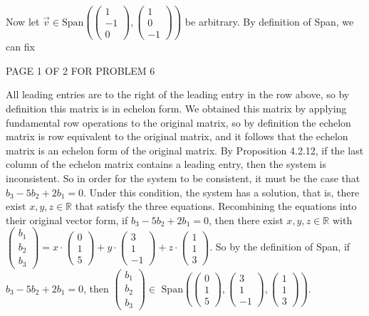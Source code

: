 \documentclass[12pt]{article}
\newenvironment{problem}[2][Problem]
{
	\begin{trivlist} 
		\item[\hskip \labelsep {\bfseries #1 #2:}]
	}
{
	\end{trivlist}
	}
\newenvironment{solution}[1][Solution]
{
	\begin{trivlist} 
		\item[\hskip \labelsep {\itshape #1:}]
	}
	{
	\end{trivlist}
}
\begin{document}
\begin{problem}{6}
\begin{solution}
Now let $\vec{v} \in \text{Span}\left(\begin{pmatrix}1\\-1\\0\end{pmatrix}, \begin{pmatrix}1\\0\\-1\end{pmatrix}\right)$ be arbitrary. By definition of Span, we can fix
\end{solution}
\vfill
\centerline{PAGE 1 OF 2 FOR PROBLEM 6}
%
%
%
\newpage
All leading entries are to the right of the leading entry in the row above, so by definition this matrix is in echelon form. We obtained this matrix by applying fundamental row operations to the original matrix, so by definition the echelon matrix is row equivalent to the original matrix, and it follows that the echelon matrix is an echelon form of the original matrix. By Proposition 4.2.12, if the last column of the echelon matrix contains a leading entry, then the system is inconsistent. So in order for the system to be consistent, it must be the case that $b_3-5b_2+2b_1 = 0$. Under this condition, the system has a solution, that is, there exist $x,y,z \in \mathbb{R}$ that satisfy the three equations. Recombining the equations into their original vector form, if $b_3-5b_2+2b_1 = 0$, then there exist $x,y,z \in \mathbb{R}$ with $\begin{pmatrix}b_1\\b_2\\b_3\end{pmatrix} = x\cdot \begin{pmatrix}0\\1\\5\end{pmatrix} + y\cdot \begin{pmatrix}3\\1\\-1\end{pmatrix}+ z\cdot \begin{pmatrix}1\\1\\3\end{pmatrix}$. So by the definition of Span, if $b_3-5b_2+2b_1 = 0$, then $\begin{pmatrix}b_1\\b_2\\b_3\end{pmatrix} \in \text{ Span}\left(\begin{pmatrix}0\\1\\5\end{pmatrix}, \begin{pmatrix}3\\1\\-1\end{pmatrix}, \begin{pmatrix}1\\1\\3\end{pmatrix}\right)$.

\end{problem}
\end{document}
